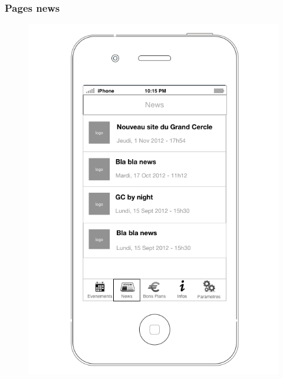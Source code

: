 \documentclass[a4paper, 11px]{article}
\begin{document}
\subsubsection{Pages news}
\begin{figure}[htbp]
	\begin{minipage}[c]{.50\linewidth}
		\begin{center}
			\includegraphics[scale=0.3]{../../Sketch/iOS/news_liste.png}
		\end{center}
	\end{minipage}
	\hfill
	\begin{minipage}[c]{.50\linewidth}
		\begin{center}

\end{center}
\end{minipage}
\end{figure}
\end{document}
